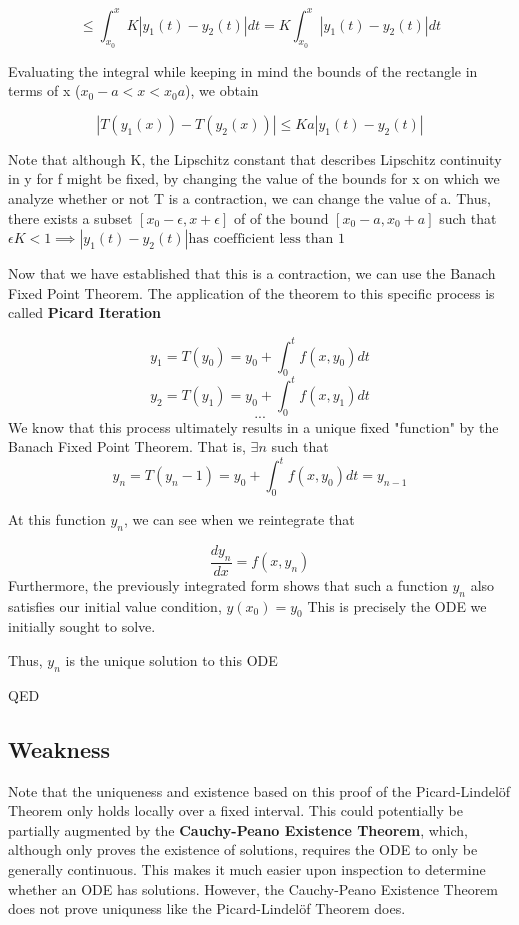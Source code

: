 \documentclass{article}
\begin{document}
$$ \leq \int_{x_0}^{x}K|y_1(t) - y_2(t)|dt = K\int_{x_0}^{x}|y_1(t) - y_2(t)|dt$$

Evaluating the integral while keeping in mind the bounds of the rectangle in terms of x ($x_0-a<x<x_0a$), we obtain

$$|T(y_1(x))-T(y_2(x))|  \leq Ka|y_1(t) - y_2(t)|$$

Note that although K, the Lipschitz constant that describes Lipschitz continuity in y for f might be fixed, by changing the value of the bounds for x on which we analyze whether or not T is a contraction, we can change the value of a. Thus, there exists a subset $[x_0-\epsilon, x+\epsilon]$ of of the bound $[x_0-a, x_0+a]$ such that $\epsilon K < 1 \implies |y_1(t) - y_2(t)| \text{has coefficient less than 1}$

Now that we have established that this is a contraction, we can use the Banach Fixed Point Theorem. The application of the theorem to this specific process is called \textbf{Picard Iteration}

$$y_1 = T(y_0) = y_0 + \int_0^t f(x, y_0)dt$$
$$y_2 = T(y_1) = y_0 + \int_0^t f(x, y_1)dt$$
$$...$$
We know that this process ultimately results in a unique fixed "function" by the Banach Fixed Point Theorem. That is, $\exists n$ such that 
$$y_n = T(y_n-1) = y_0 + \int_0^t f(x, y_0)dt = y_{n-1}$$

At this function $y_n$, we can see when we reintegrate that

$$\frac{dy_n}{dx} = f(x, y_n)$$
Furthermore, the previously integrated form shows that such a function $y_n$ also satisfies our initial value condition, $y(x_0) = y_0$
This is precisely the ODE we initially sought to solve.

Thus, $y_n$ is the unique solution to this ODE

QED

\subsection{Weakness} Note that the uniqueness and existence based on this proof of the Picard-Lindelöf Theorem only holds locally over a fixed interval. This could potentially be partially augmented by the \textbf{Cauchy-Peano Existence Theorem}, which, although only proves the existence of solutions, requires the ODE to only be generally continuous. This makes it much easier upon inspection to determine whether an ODE has solutions. However, the Cauchy-Peano Existence Theorem does not prove uniquness like the Picard-Lindelöf Theorem does.
\end{document}

